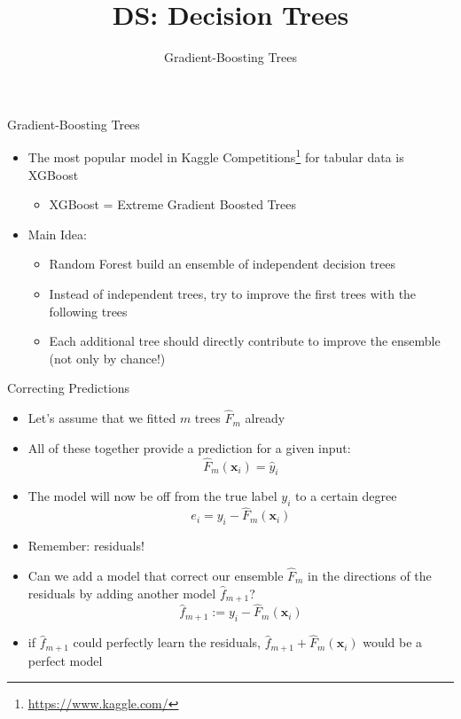 \documentclass[aspectratio=169]{../latex_main/tntbeamer}  %
\title[Gradient-Boosting Trees]{DS: Decision Trees}
\subtitle{Gradient-Boosting Trees}
\begin{document}
	
	\maketitle
	\begin{frame}[c]{Gradient-Boosting Trees}

    \begin{itemize}
        \item The most popular model in Kaggle Competitions\footnote{\url{https://www.kaggle.com/}} for tabular data is XGBoost
        \begin{itemize}
            \item XGBoost = Extreme Gradient Boosted Trees
        \end{itemize}
        \smallskip
        \item Main Idea:
        \begin{itemize}
            \item Random Forest build an ensemble of independent decision trees
            \item Instead of independent trees, try to improve the first trees with the following trees
            \item Each additional tree should directly contribute to improve the ensemble (not only by chance!)
        \end{itemize}
    \end{itemize}

	\end{frame}
	
	\begin{frame}[c]{Correcting Predictions}

    \vspace{-1em}
    \begin{itemize}
        \item Let's assume that we fitted $m$ trees $\hat{F}_m$ already
        \item All of these together provide a prediction for a given input:
        $$ \hat{F}_m(\bm{x}_i) = \hat{y}_i $$
        \smallskip
        \item The model will now be off from the true label $y_i$ to a certain degree
        $$e_i = y_i - \hat{F}_m(\bm{x}_i)$$
        \item Remember: residuals!
        \smallskip
        \item Can we add a model that correct our ensemble $\hat{F}_m$ in the directions of the residuals by adding another model $\hat{f}_{m+1}$?
        $$ \hat{f}_{m+1} :=  y_i - \hat{F}_m(\bm{x}_i)$$ 
        \item if $ \hat{f}_{m+1}$ could perfectly learn the residuals, $\hat{f}_{m+1} +  \hat{F}_m(\bm{x}_i)$ would be a perfect model
    \end{itemize}

	\end{frame}
	
\end{document}
